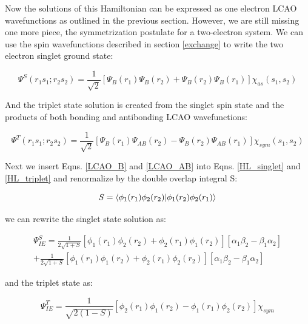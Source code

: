 Now the solutions of this Hamiltonian can be expressed as one electron LCAO wavefunctions as outlined in the previous section. However, we are still missing one more piece, the symmetrization postulate for a two-electron system. We can use the spin wavefunctions described in section \ref{exchange} to write the two electron singlet ground state:

\begin{equation}
\Psi^S(r_1 s_1;r_2 s_2)=\frac{1}{\sqrt{2}}[\Psi_B(r_1)\Psi_{B}(r_2)+\Psi_B(r_2)\Psi_B(r_1)]\chi_{as}(s_1,s_2)
\label{HL_singlet}
\end{equation}

And the triplet state solution is created from the singlet spin state and the products of both bonding and antibonding LCAO wavefunctions:

\begin{equation}
\Psi^T(r_1 s_1;r_2 s_2)=\frac{1}{\sqrt{2}}[\Psi_B(r_1)\Psi_{AB}(r_2)-\Psi_B(r_2)\Psi_{AB}(r_1)]\chi_{sym}(s_1,s_2)
\label{HL_triplet}
\end{equation}

Next we insert Eqns. \ref{LCAO_B} and \ref{LCAO_AB} into Eqns. \ref{HL_singlet} and \ref{HL_triplet} and renormalize by the double overlap integral S:

\begin{equation}
S = \braket{\phi_1(r_1)\phi_2(r_2)|\phi_1(r_2)\phi_2(r_1)}
\label{doubleoverint}
\end{equation}

we can rewrite the singlet state solution as:

\begin{eqnarray}
\Psi_{IE}^S=\frac{1}{2\sqrt{1+S}}[\phi_1(r_1)\phi_2(r_2)+\phi_2(r_1)\phi_1(r_2)][\alpha_1\beta_2-\beta_1\alpha_2] \\
+\frac{1}{2\sqrt{1+S}}[\phi_1(r_1)\phi_1(r_2)+\phi_2(r_1)\phi_2(r_2)][\alpha_1\beta_2-\beta_1\alpha_2]
\label{IE_2e-}
\end{eqnarray}

and the triplet state as:

\begin{equation}
\Psi_{IE}^T=\frac{1}{\sqrt{2(1-S)}}[\phi_2(r_1)\phi_1(r_2)-\phi_1(r_1)\phi_2(r_2)]\chi_{sym}
\end{equation}

